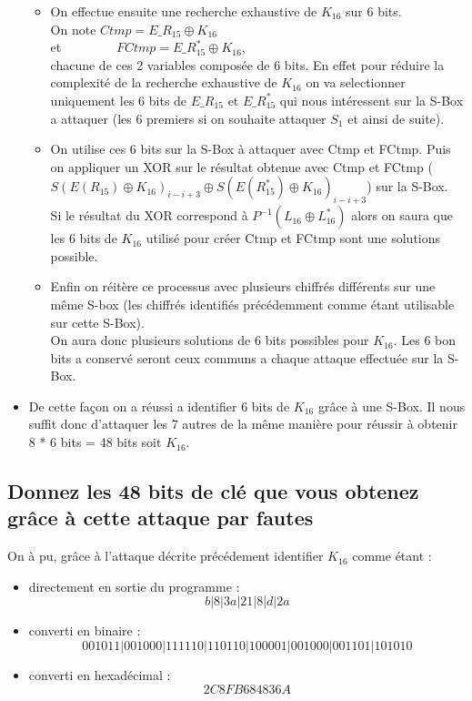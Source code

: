 \documentclass[a4paper,11pt]{article}
\begin{document}
\begin{itemize}
\begin{itemize}
			\item On effectue ensuite une recherche exhaustive de $K_{16}$ sur 6 bits.\\
			On note $Ctmp = E\_R_{15} \oplus K_{16}$ \\
			et \ \ \ \ \ \ \ \ $FCtmp = E\_R_{15}^{*} \oplus K_{16}$,\\ chacune de ces 2 variables composée de 6 bits. En effet pour réduire la complexité de la recherche exhaustive de $ K_{16}$ on va selectionner uniquement les 6 bits de $E\_R_{15}$ et  $E\_R_{15}^{*}$ qui nous intéressent sur la S-Box a attaquer (les 6 premiers si on souhaite attaquer $S_{1}$ et ainsi de suite).\\
			\item On utilise ces 6 bits sur la S-Box à attaquer avec Ctmp et FCtmp. Puis on appliquer un XOR sur le résultat obtenue avec Ctmp et FCtmp ($S(E(R_{15})\oplus K_{16})_{i-i+3} \oplus S(E(R_{15}^{*})\oplus K_{16})_{i-i+3}$) sur la S-Box.\\
			Si le résultat du XOR correspond à  $P^{-1}(L_{16} \oplus L_{16}^{*})$ alors on saura que les 6 bits de $K_{16}$ utilisé pour créer Ctmp et FCtmp sont une solutions possible.
			\item Enfin on réitère ce processus avec plusieurs chiffrés différents sur une même S-box (les chiffrés identifiés précédemment comme étant utilisable sur cette S-Box).\\
			On aura donc plusieurs solutions de 6 bits possibles pour $K_{16}$. Les 6 bon bits a conservé seront ceux communs a chaque attaque effectuée sur la S-Box. 
		\end{itemize}
		\item De cette façon on a réussi a identifier 6 bits de $K_{16}$ grâce à une S-Box. Il nous suffit donc d'attaquer les 7 autres de la même manière pour réussir à obtenir 8 * 6 bits = 48 bits soit $K_{16}$.
	\end{itemize} 
	\subsection{Donnez les 48 bits de clé que vous obtenez grâce à cette attaque par fautes}
	On à pu, grâce à l'attaque décrite précédement identifier $K_{16}$ comme étant :\\
	\begin{itemize}
		\item directement en sortie du programme : $$b|8|3a|21|8|d|2a$$
		\item converti en binaire : $$001011|001000|111110|110110|100001|001000|001101|101010$$
		\item converti en hexadécimal : $$2C8FB684836A$$
	\end{itemize}
\end{document}
